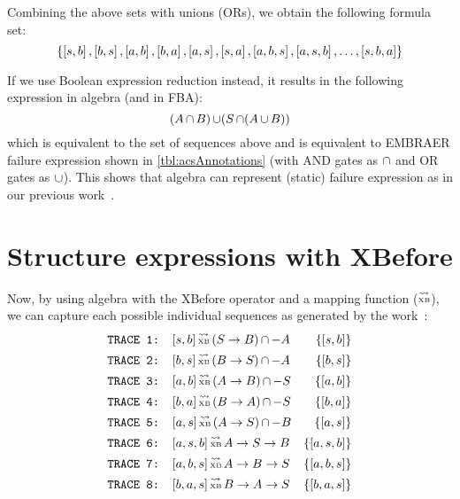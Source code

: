 \documentclass[12pt,openright,twoside,a4paper,oldfontcommands,english,brazil,final]{abntex2}
\theoremstyle{theo}
\newcommand{\EMBRAER}{EMBRAER\xspace}
\def\xbeforeop{\ensuremath\rightarrow}
\newcommand{\xbefore}[2]{\ensuremath #1 \xbeforeop #2 }
\def\tracetoalgebra{\ensuremath\operatorname{\stackrel{\leadsto}{\text{\tiny XB}}}}
\newcommand{\listsin}[1]{\ensuremath\left[ #1 \right]}
\newcommand{\parsin}[1]{\ensuremath\left( #1 \right)}
\def\union{\ensuremath\operatorname{\cup}}
\def\inter{\ensuremath\operatorname{\cap}}
\begin{document}
Combining the above sets with unions (ORs), we obtain the following formula set:
%
\[
\left\{ \listsin{s,b}, \listsin{b,s}, \listsin{a,b}, \listsin{b,a}, \listsin{a,s}, \listsin{s,a}, \listsin{a,b,s}, \listsin{a,s,b},\ldots,\listsin{s,b,a} \right\}
\]

If we use Boolean expression reduction instead, it results in the following expression in \ac{algebra} (and in \ac{FBA}):
\[
(A \inter B) \union (S \inter (A \union B))
\]
%
which is equivalent to the set of sequences above and is equivalent to \EMBRAER failure expression shown in \cref{tbl:acsAnnotations} (with \ac{AND} gates as $\inter$ and \ac{OR} gates as $\union$).
%
This shows that \ac{algebra} can represent (static) failure expression as in our previous work~\cite{DM2012}.

\section{Structure expressions with \acs*{XBefore}}
\label{sec:case-study-xbefore}

Now, by using \ac{algebra} with the \ac{XBefore} operator and a mapping function ($\tracetoalgebra$), we can capture each possible individual sequences as generated by the work~\cite{DM2012}:
%
\begin{align*}
\text{\texttt{TRACE 1: }}&[s,b] \tracetoalgebra \parsin{\xbefore{S}{B}} \inter -A & \left\{[s,b]\right\}\\
\text{\texttt{TRACE 2: }}&[b,s] \tracetoalgebra \parsin{\xbefore{B}{S}} \inter -A & \left\{[b,s]\right\}\\
\text{\texttt{TRACE 3: }}&[a,b] \tracetoalgebra \parsin{\xbefore{A}{B}} \inter -S & \left\{[a,b]\right\}\\
\text{\texttt{TRACE 4: }}&[b,a] \tracetoalgebra \parsin{\xbefore{B}{A}} \inter -S & \left\{[b,a]\right\}\\
\text{\texttt{TRACE 5: }}&[a,s] \tracetoalgebra \parsin{\xbefore{A}{S}} \inter -B & \left\{[a,s]\right\}\\
\text{\texttt{TRACE 6: }}&[a,s,b] \tracetoalgebra \xbefore{\xbefore{A}{S}}{B} & \left\{[a,s,b]\right\}\\
\text{\texttt{TRACE 7: }}&[a,b,s] \tracetoalgebra \xbefore{\xbefore{A}{B}}{S} & \left\{[a,b,s]\right\}\\
\text{\texttt{TRACE 8: }}&[b,a,s] \tracetoalgebra \xbefore{\xbefore{B}{A}}{S} & \left\{[b,a,s]\right\}
\end{align*}
\end{document}
